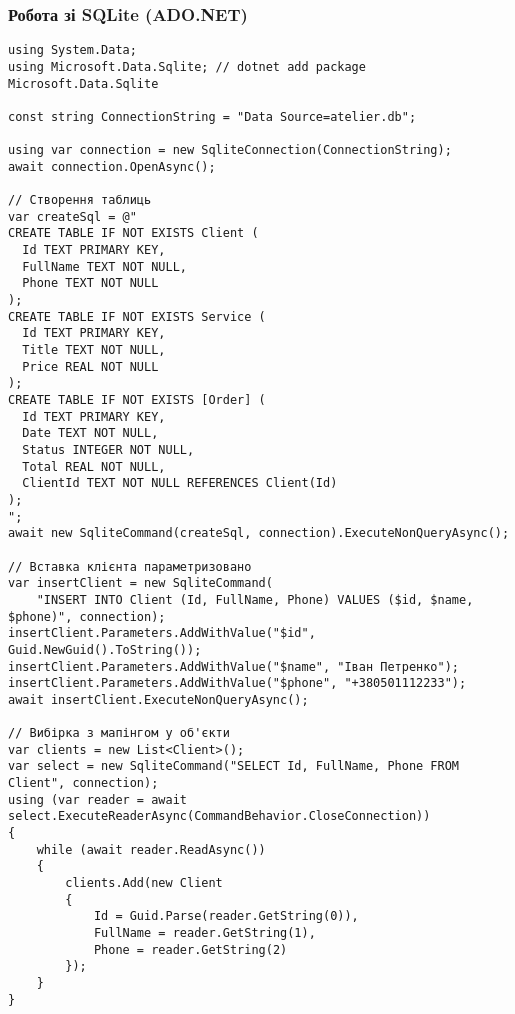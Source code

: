 \documentclass[14pt,a4paper]{extarticle}
\begin{document}
\subsubsection*{Робота зі SQLite (ADO.NET)}
\begin{lstlisting}[language=CSharp,caption={Ініціалізація SQLite та запити}]
using System.Data;
using Microsoft.Data.Sqlite; // dotnet add package Microsoft.Data.Sqlite

const string ConnectionString = "Data Source=atelier.db";

using var connection = new SqliteConnection(ConnectionString);
await connection.OpenAsync();

// Створення таблиць
var createSql = @"
CREATE TABLE IF NOT EXISTS Client (
  Id TEXT PRIMARY KEY,
  FullName TEXT NOT NULL,
  Phone TEXT NOT NULL
);
CREATE TABLE IF NOT EXISTS Service (
  Id TEXT PRIMARY KEY,
  Title TEXT NOT NULL,
  Price REAL NOT NULL
);
CREATE TABLE IF NOT EXISTS [Order] (
  Id TEXT PRIMARY KEY,
  Date TEXT NOT NULL,
  Status INTEGER NOT NULL,
  Total REAL NOT NULL,
  ClientId TEXT NOT NULL REFERENCES Client(Id)
);
";
await new SqliteCommand(createSql, connection).ExecuteNonQueryAsync();

// Вставка клієнта параметризовано
var insertClient = new SqliteCommand(
    "INSERT INTO Client (Id, FullName, Phone) VALUES ($id, $name, $phone)", connection);
insertClient.Parameters.AddWithValue("$id", Guid.NewGuid().ToString());
insertClient.Parameters.AddWithValue("$name", "Іван Петренко");
insertClient.Parameters.AddWithValue("$phone", "+380501112233");
await insertClient.ExecuteNonQueryAsync();

// Вибірка з мапінгом у об'єкти
var clients = new List<Client>();
var select = new SqliteCommand("SELECT Id, FullName, Phone FROM Client", connection);
using (var reader = await select.ExecuteReaderAsync(CommandBehavior.CloseConnection))
{
    while (await reader.ReadAsync())
    {
        clients.Add(new Client
        {
            Id = Guid.Parse(reader.GetString(0)),
            FullName = reader.GetString(1),
            Phone = reader.GetString(2)
        });
    }
}
\end{lstlisting}
\end{document}

